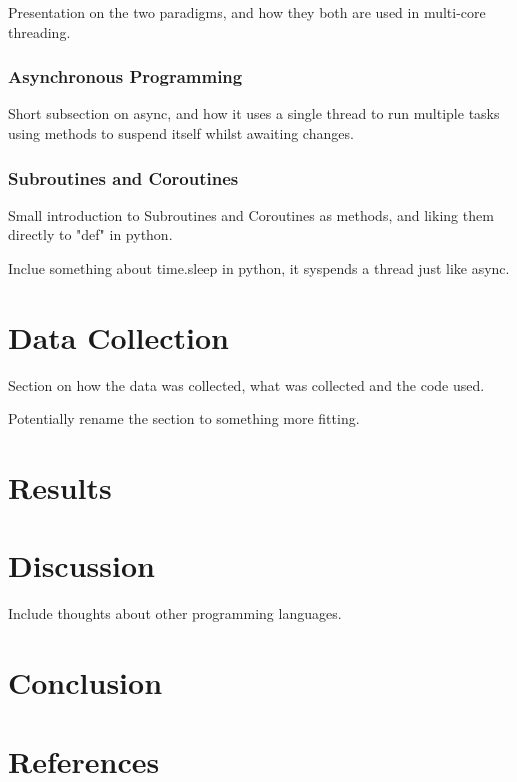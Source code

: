 \documentclass{article}
\begin{document}
Presentation on the two paradigms, and how they both are used in multi-core threading.

\subsubsection{Asynchronous Programming}

Short subsection on async, and how it uses a single thread to run multiple tasks using methods to suspend itself whilst awaiting changes.

\subsubsection{Subroutines and Coroutines}

Small introduction to Subroutines and Coroutines as methods, and liking them directly to "def" in python.

Inclue something about time.sleep in python, it syspends a thread just like async.

\section{Data Collection}

Section on how the data was collected, what was collected and the code used. 

Potentially rename the section to something more fitting.

\section{Results}

\section{Discussion}

Include thoughts about other programming languages.

\section{Conclusion}
\newpage
\section{References}
\printbibliography
\end{document}
